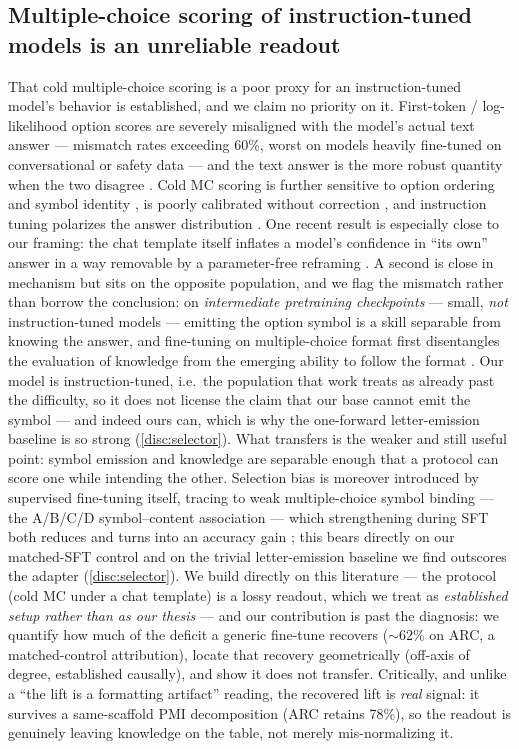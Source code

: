 \subsection{Multiple-choice scoring of instruction-tuned models is an unreliable
readout}\label{related:mcunreliable}

That cold multiple-choice scoring is a poor proxy for an instruction-tuned model's
behavior is established, and we claim no priority on it. First-token /
log-likelihood option scores are severely misaligned with the model's actual text
answer --- mismatch rates exceeding 60\%, worst on models heavily fine-tuned on
conversational or safety data \citep{MyAnswerIsC} --- and the text answer is the
more robust quantity when the two disagree \citep{LookAtTheText}. Cold MC scoring is
further sensitive to option ordering and symbol identity
\citep{PriDe,OrderSensitivity}, is poorly calibrated without correction
\citep{CalibrateBeforeUse}, and instruction tuning polarizes the answer distribution
\citep{folktexts}. One recent result is especially close to our framing: the chat
template itself inflates a model's confidence in ``its own'' answer in a way
removable by a parameter-free reframing \citep{OwnershipBias}. A second is close in
mechanism but sits on the opposite population, and we flag the mismatch rather than
borrow the conclusion: on \emph{intermediate pretraining checkpoints} --- small,
\emph{not} instruction-tuned models --- emitting the option symbol is a skill
separable from knowing the answer, and fine-tuning on multiple-choice format first
disentangles the evaluation of knowledge from the emerging ability to follow the
format \citep{FormatFirst}. Our model is instruction-tuned, i.e.\ the population that
work treats as already past the difficulty, so it does not license the claim that our
base cannot emit the symbol --- and indeed ours can, which is why the one-forward
letter-emission baseline is so strong (\cref{disc:selector}). What transfers is the
weaker and still useful point: symbol emission and knowledge are separable enough
that a protocol can score one while intending the other. Selection bias is moreover introduced by supervised
fine-tuning itself, tracing to weak multiple-choice symbol binding --- the A/B/C/D
symbol--content association --- which strengthening during SFT both reduces and turns
into an accuracy gain \citep{SymbolBinding}; this bears directly on our matched-SFT
control and on the trivial letter-emission baseline we find outscores the adapter
(\cref{disc:selector}). We build directly on this literature --- the
protocol (cold MC under a chat template) is a lossy readout, which we treat as
\emph{established setup rather than as our thesis} --- and our contribution is past
the diagnosis: we quantify how much of the deficit a generic fine-tune recovers
(${\sim}62\%$ on ARC, a matched-control attribution), locate that recovery
geometrically (off-axis of degree, established causally), and show it does not
transfer. Critically, and unlike a ``the lift is a formatting artifact'' reading,
the recovered lift is \emph{real} signal: it survives a same-scaffold PMI
decomposition (ARC retains 78\%), so the readout is genuinely leaving knowledge on
the table, not merely mis-normalizing it.

